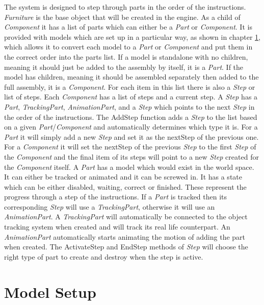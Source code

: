 \documentclass{l4proj}
\begin{document}

The system is designed to step through parts in the order of the instructions. \textit{Furniture} is the base object that will be created in the engine. As a child of \textit{Component} it has a list of parts which can either be a \textit{Part} or \textit{Component}. It is provided with models which are set up in a particular way, as shown in chapter \ref{modelSetup}, which allows it to convert each model to a \textit{Part} or \textit{Component} and put them in the correct order into the parts list. If a model is standalone with no children, meaning it should just be added to the assembly by itself, it is a \textit{Part}. If the model has children, meaning it should be assembled separately then added to the full assembly, it is a \textit{Component}. For each item in this list there is also a \textit{Step} or list of steps. Each \textit{Component} has a list of steps and a current step. A \textit{Step} has a \textit{Part}, \textit{TrackingPart}, \textit{AnimationPart}, and a \textit{Step} which points to the next \textit{Step} in the order of the instructions. The AddStep function adds a \textit{Step} to the list based on a given \textit{Part}/\textit{Component} and automatically determines which type it is. For a \textit{Part} it will simply add a new \textit{Step} and set it as the nextStep of the previous one. For a \textit{Component} it will set the nextStep of the previous \textit{Step} to the first \textit{Step} of the \textit{Component} and the final item of its steps will point to a new \textit{Step} created for the \textit{Component} itself. A \textit{Part} has a model which would exist in the world space. It can either be tracked or animated and it can be screwed in. It has a state which can be either disabled, waiting, correct or finished. These represent the progress through a step of the instructions. If a \textit{Part} is tracked then its corresponding \textit{Step} will use a \textit{TrackingPart}, otherwise it will use an \textit{AnimationPart}. A \textit{TrackingPart} will automatically be connected to the object tracking system when created and will track its real life counterpart. An \textit{AnimationPart} automatically starts animating the motion of adding the part when created. The ActivateStep and EndStep methods of \textit{Step} will choose the right type of part to create and destroy when the step is active.

\section{Model Setup} \label{modelSetup}
\end{document}
